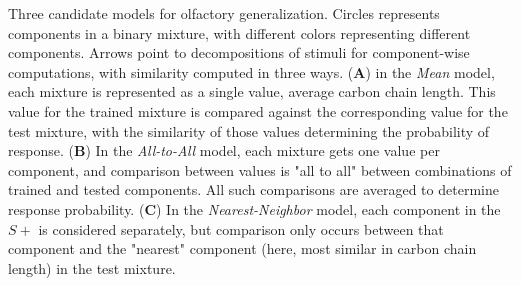 \label{fig:cartoon}
Three candidate models for olfactory generalization.  Circles represents components in a binary mixture, with different colors representing different components.  Arrows point to decompositions of stimuli for component-wise computations, with similarity computed in three ways. (\textbf{A}) in the \textit{Mean} model, each mixture is represented as a single value, average carbon chain length.  This value for the trained mixture is compared against the corresponding value for the test mixture, with the similarity of those values determining the probability of response. (\textbf{B}) In the \textit{All-to-All} model, each mixture gets one value per component, and comparison between values is "all to all" between combinations of trained and tested components.  All such comparisons are averaged to determine response probability. (\textbf{C}) In the \textit{Nearest-Neighbor} model, each component in the $S+$ is considered separately, but comparison only occurs between that component and the "nearest" component (here, most similar in carbon chain length) in the test mixture.  